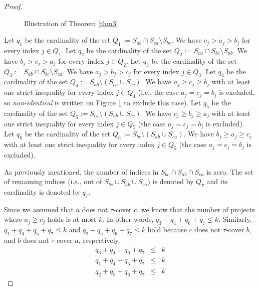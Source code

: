 \documentclass{article}
\begin{document}
\begin{proof}
\begin{figure}
\begin{center}
\begin{tikzpicture}[scale=1]
\end{tikzpicture}

\end{center}

\caption{\label{fig1} Illustration of Theorem \ref{thm3}}
\end{figure}



Let $q_1$ be the cardinality of the set $Q_1:=S_{ab} \cap S_{ca} \setminus S_{bc}$. We have $c_j>a_j>b_j$ for every index $j \in Q_1$.  
Let $q_2$ be the cardinality of the set $Q_2:=S_{ca} \cap S_{bc} \setminus S_{ab}$. We have $b_j>c_j>a_j$ for every index $j \in Q_2$. 
Let $q_3$ be the cardinality of the set $Q_3:=S_{ab} \cap S_{bc} \setminus S_{ca}$.  We have $a_j>b_j>c_j$ for every index $j \in Q_3$. 
Let $q_4$ be the cardinality of the set $Q_4:=S_{ab} \setminus (S_{ca} \cup S_{bc})$. 
We have $a_j \ge c_j \ge b_j$ with at least one strict inequality for every index $j \in Q_4$ (i.e., the case $a_j=c_j=b_j$ is excluded, so {\em non-identical} is written on Figure \ref{fig1} to exclude this case). 
Let $q_5$  be the cardinality of the set $Q_5:=S_{ca} \setminus (S_{ab} \cup S_{bc})$. We have $c_j \ge b_j \ge a_j$ with at least one strict inequality for every index $j \in Q_5$ (the case $a_j=c_j=b_j$ is excluded). 
Let $q_6$ be the cardinality of the set $Q_6:=S_{bc} \setminus (S_{ab} \cup S_{ca})$. We have $b_j \ge a_j \ge c_j$ with at least one strict inequality for every index $j \in Q_5$ (the case $a_j=c_j=b_j$ is excluded). 


As previously mentioned, the number of indices in $S_{bc} \cap S_{ab} \cap S_{ca}$ is zero. The set of remaining indices (i.e., out of $S_{bc} \cup S_{ab} \cup S_{ca}$) is denoted by $Q_7$ and its cardinality is denoted by $q_7$.           



Since we assumed that $a$ does not $\tau$-cover $c$, we know that the number of projects where $a_j \ge c_j$ holds is at most $k$. In other words, $q_3+q_4+q_6+q_7 \le k$. Similarly, $q_1+q_4+q_5+q_7 \le k$ and $q_2+q_5+q_6+q_7 \le k$ hold because $c$ does not $\tau$-cover $b$, and $b$ does not $\tau$-cover $a$, respectively. %
\begin{eqnarray} \label{ineq01}
q_3+q_4+q_6+q_7 &\le& k\\ \label{ineq02}
q_1+q_4+q_5+q_7 &\le& k\\ \label{ineq03}
q_2+q_5+q_6+q_7 &\le& k
\end{eqnarray}





\end{proof}
\end{document}
